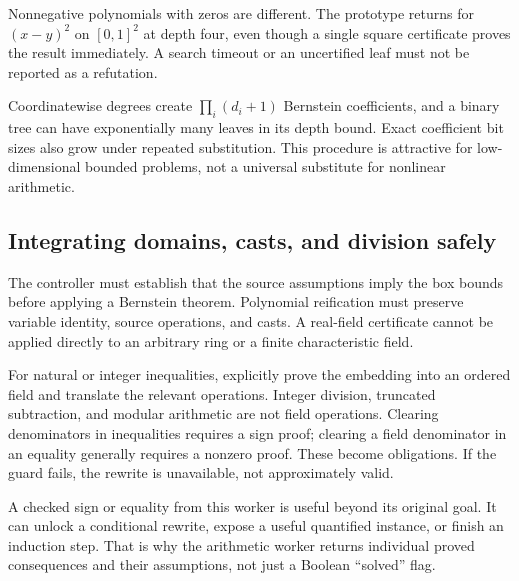 Nonnegative polynomials with zeros are different. The prototype returns
 for $(x-y)^2$ on $[0,1]^2$ at depth four, even though a single
square certificate proves the result immediately. A search timeout or an
uncertified leaf must not be reported as a refutation.

Coordinatewise degrees create $\prod_i(d_i+1)$ Bernstein coefficients, and a
binary tree can have exponentially many leaves in its depth bound. Exact
coefficient bit sizes also grow under repeated substitution. This procedure
is attractive for low-dimensional bounded problems, not a universal substitute
for nonlinear arithmetic.

\subsection{Integrating domains, casts, and division safely}

The controller must establish that the source assumptions imply the box bounds
before applying a Bernstein theorem. Polynomial reification must preserve
variable identity, source operations, and casts. A real-field certificate
cannot be applied directly to an arbitrary ring or a finite characteristic
field.

For natural or integer inequalities, explicitly prove the embedding into an
ordered field and translate the relevant operations. Integer division,
truncated subtraction, and modular arithmetic are not field operations.
Clearing denominators in inequalities requires a sign proof; clearing a field
denominator in an equality generally requires a nonzero proof. These become
 obligations. If the guard fails, the rewrite is unavailable,
not approximately valid.

A checked sign or equality from this worker is useful beyond its original
goal. It can unlock a conditional rewrite, expose a useful quantified
instance, or finish an induction step. That is why the arithmetic worker
returns individual proved consequences and their assumptions, not just a
Boolean ``solved'' flag.
